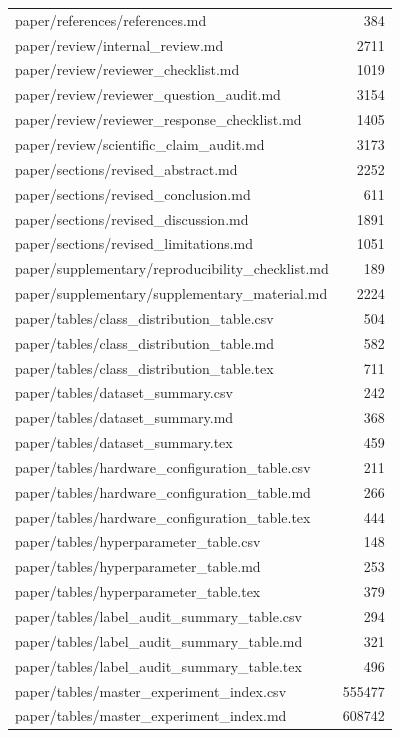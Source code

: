 \begin{tabular}{lr}
paper/references/references.md & 384 \\
paper/review/internal\_review.md & 2711 \\
paper/review/reviewer\_checklist.md & 1019 \\
paper/review/reviewer\_question\_audit.md & 3154 \\
paper/review/reviewer\_response\_checklist.md & 1405 \\
paper/review/scientific\_claim\_audit.md & 3173 \\
paper/sections/revised\_abstract.md & 2252 \\
paper/sections/revised\_conclusion.md & 611 \\
paper/sections/revised\_discussion.md & 1891 \\
paper/sections/revised\_limitations.md & 1051 \\
paper/supplementary/reproducibility\_checklist.md & 189 \\
paper/supplementary/supplementary\_material.md & 2224 \\
paper/tables/class\_distribution\_table.csv & 504 \\
paper/tables/class\_distribution\_table.md & 582 \\
paper/tables/class\_distribution\_table.tex & 711 \\
paper/tables/dataset\_summary.csv & 242 \\
paper/tables/dataset\_summary.md & 368 \\
paper/tables/dataset\_summary.tex & 459 \\
paper/tables/hardware\_configuration\_table.csv & 211 \\
paper/tables/hardware\_configuration\_table.md & 266 \\
paper/tables/hardware\_configuration\_table.tex & 444 \\
paper/tables/hyperparameter\_table.csv & 148 \\
paper/tables/hyperparameter\_table.md & 253 \\
paper/tables/hyperparameter\_table.tex & 379 \\
paper/tables/label\_audit\_summary\_table.csv & 294 \\
paper/tables/label\_audit\_summary\_table.md & 321 \\
paper/tables/label\_audit\_summary\_table.tex & 496 \\
paper/tables/master\_experiment\_index.csv & 555477 \\
paper/tables/master\_experiment\_index.md & 608742 \\

\end{tabular}
